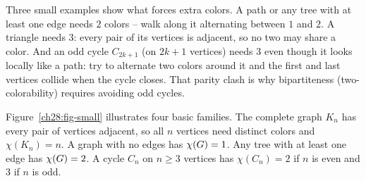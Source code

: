 \begin{intuitionbox}
Three small examples show what forces extra colors. A path or any tree with at least one edge needs $2$ colors -- walk
along it alternating between $1$ and $2$. A triangle needs $3$: every pair of its vertices is
adjacent, so no two may share a color. And an odd cycle $C_{2k+1}$ (on $2k+1$ vertices) needs $3$ even
though it looks locally like a path: try to alternate two colors around it and the first and last vertices collide when the cycle closes. That parity clash is why bipartiteness (two-colorability) requires avoiding odd cycles.
\end{intuitionbox}

Figure~\ref{ch28:fig-small} illustrates four basic families. The complete graph $K_n$ has every
pair of vertices adjacent, so all $n$ vertices need distinct colors and $\chi(K_n)=n$. A graph
with no edges has $\chi(G)=1$. Any tree with at least one edge has $\chi(G)=2$. A cycle $C_n$ on $n\ge 3$ vertices has $\chi(C_n)=2$ if $n$ is even and $3$
if $n$ is odd.

